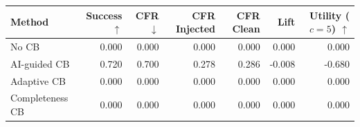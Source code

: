 \begin{tabular}{lrrrrrr}
\toprule
Method & Success $\uparrow$ & CFR $\downarrow$ & CFR Injected & CFR Clean & Lift & Utility ($c=5$) $\uparrow$ \\
\midrule
No CB & 0.000 & 0.000 & 0.000 & 0.000 & 0.000 & 0.000 \\
AI-guided CB & 0.720 & 0.700 & 0.278 & 0.286 & -0.008 & -0.680 \\
Adaptive CB & 0.000 & 0.000 & 0.000 & 0.000 & 0.000 & 0.000 \\
Completeness CB & 0.000 & 0.000 & 0.000 & 0.000 & 0.000 & 0.000 \\
\bottomrule
\end{tabular}
